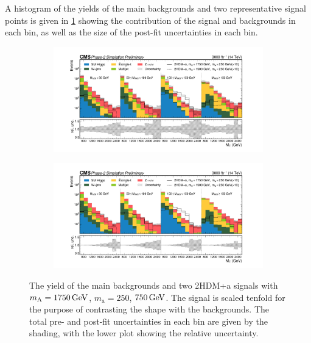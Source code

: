 A histogram of the yields of the main backgrounds and two representative signal points is given in \cref{fig:srbins} showing the contribution of the signal and backgrounds in each bin, as well as the size of the post-fit uncertainties in each bin.

\begin{figure}[ht]
    \centering
    \begin{subfigure}[b]{\textwidth}
        \includegraphics[width=\textwidth]{Chapters/Signal_Extraction/prefit_sr.pdf}
    \end{subfigure}
    \begin{subfigure}[b]{\textwidth}
        \includegraphics[width=\textwidth]{Chapters/Signal_Extraction/postfit_sr.pdf}
    \end{subfigure}
    \caption{The yield of the main backgrounds and two 2HDM+a signals with $m_\mathrm{A} = \GeV{1750}$, $m_\mathrm{a} = 250$, $\GeV{750}$. The signal is scaled tenfold for the purpose of contrasting the shape with the backgrounds. The total pre- and post-fit uncertainties in each bin are given by the shading, with the lower plot showing the relative uncertainty.}
    \label{fig:srbins}
\end{figure}